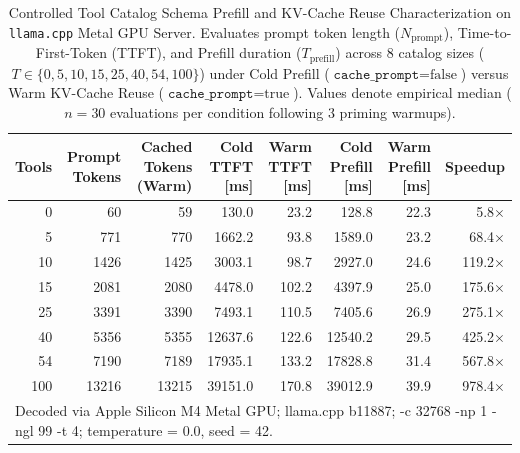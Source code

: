 \begin{table}[t]
\centering
\caption{Controlled Tool Catalog Schema Prefill and KV-Cache Reuse Characterization on \texttt{llama.cpp} Metal GPU Server. Evaluates prompt token length ($N_{\text{prompt}}$), Time-to-First-Token (TTFT), and Prefill duration ($T_{\text{prefill}}$) across 8 catalog sizes ($T \in \{0, 5, 10, 15, 25, 40, 54, 100\}$) under Cold Prefill ($\texttt{cache\_prompt} = \text{false}$) versus Warm KV-Cache Reuse ($\texttt{cache\_prompt} = \text{true}$). Values denote empirical median ($n=30$ evaluations per condition following 3 priming warmups).}
\label{tab:prefill_ablation}
\small
\begin{tabular}{r r r r r r r r}
\hline
\textbf{Tools} & \textbf{Prompt Tokens} & \textbf{Cached Tokens (Warm)} & \textbf{Cold TTFT [ms]} & \textbf{Warm TTFT [ms]} & \textbf{Cold Prefill [ms]} & \textbf{Warm Prefill [ms]} & \textbf{Speedup} \\
\hline
0 & 60 & 59 & 130.0 & 23.2 & 128.8 & 22.3 & 5.8$\times$ \\
5 & 771 & 770 & 1662.2 & 93.8 & 1589.0 & 23.2 & 68.4$\times$ \\
10 & 1426 & 1425 & 3003.1 & 98.7 & 2927.0 & 24.6 & 119.2$\times$ \\
15 & 2081 & 2080 & 4478.0 & 102.2 & 4397.9 & 25.0 & 175.6$\times$ \\
25 & 3391 & 3390 & 7493.1 & 110.5 & 7405.6 & 26.9 & 275.1$\times$ \\
40 & 5356 & 5355 & 12637.6 & 122.6 & 12540.2 & 29.5 & 425.2$\times$ \\
54 & 7190 & 7189 & 17935.1 & 133.2 & 17828.8 & 31.4 & 567.8$\times$ \\
100 & 13216 & 13215 & 39151.0 & 170.8 & 39012.9 & 39.9 & 978.4$\times$ \\
\hline
\multicolumn{8}{l}{\footnotesize Decoded via Apple Silicon M4 Metal GPU; llama.cpp b11887; -c 32768 -np 1 -ngl 99 -t 4; temperature = 0.0, seed = 42.} \\
\hline
\end{tabular}
\end{table}
